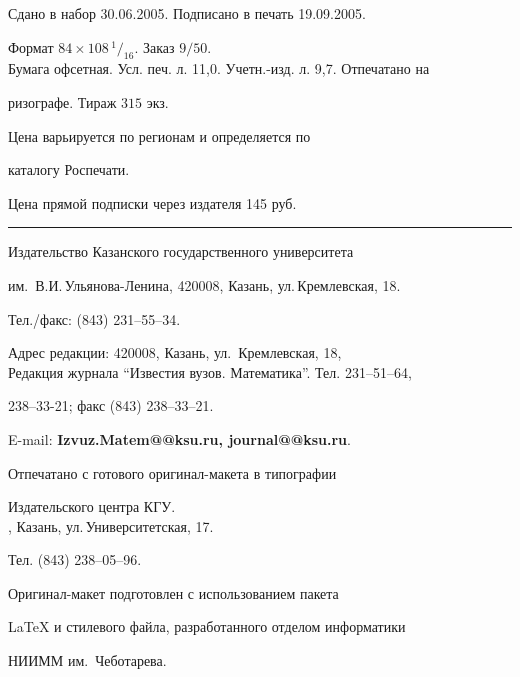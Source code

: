 \noindent Сдано в набор 30.06.2005. Подписано в печать 19.09.2005.


Формат $84\times 108 \,^1/_{16}.$ Заказ $9/50$.\\


Бумага офсетная. Усл. печ. л. 11,0. Учетн.-изд. л. 9,7. Отпечатано на 


ризографе. Тираж $315$ экз. 





\noindent Цена варьируется по регионам и определяется по 


каталогу Роспечати. 





\noindent Цена прямой подписки через издателя 145 руб. 


\bigskip


\hrule


\bigskip


\noindent Издательство Казанского государственного университета


им.~В.И.\,Ульянова-Ленина, 420008, Казань, ул.\,Кремлевская, 18.


Тел./факс: (843) 231--55--34.\\


\smallskip





\noindent Адрес редакции: 420008, Казань, ул.~Кремлевская, 18,\\  


Редакция журнала  ``Известия вузов. Математика''. Тел. 231--51--64,


238--33-21; факс (843) 238--33--21.





\noindent E-mail: {\bf Izvuz.Matem@@ksu.ru, journal@@ksu.ru}. \par


\bigskip 


\noindent Отпечатано с готового оригинал-макета в типографии


Издательского центра КГУ. \\





, Казань, ул.\,Университетская, 17.


Тел. (843) 238--05--96. \par


\bigskip


\noindent Оригинал-макет подготовлен с использованием пакета


\AmS\LaTeX{} и стилевого файла, разработанного отделом информатики


НИИММ им.~Чеботарева.








